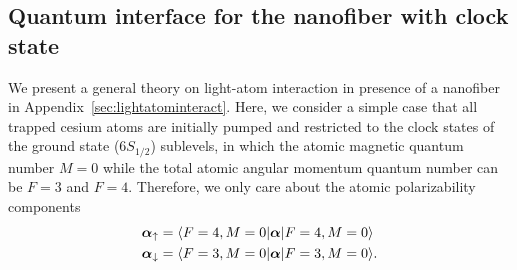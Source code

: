 \documentclass[preprint,aps,pra,onecolumn]{revtex4-1} %
\renewcommand{\tensor}[1]{\boldsymbol{#1}}
\begin{document}



\subsection{Quantum interface for the nanofiber with clock state}
We present a general theory on light-atom interaction in presence of a nanofiber in Appendix~\ref{sec:lightatominteract}. Here, we consider a simple case that all trapped cesium atoms are initially pumped and restricted to the clock states of the ground state ($6S_{1/2}$) sublevels, in which the atomic magnetic quantum number $M=0$ while the total atomic angular momentum quantum number can be $F=3$ and $F=4$. Therefore, we only care about the atomic polarizability components
\begin{align}
\tensor{\alpha}_{\uparrow} &=\bra{F=4,M=0}\tensor{\alpha}\ket{F=4,M=0}\\
\tensor{\alpha}_{\downarrow} &=\bra{F=3,M=0}\tensor{\alpha}\ket{F=3,M=0}.
\end{align}
\end{document}
